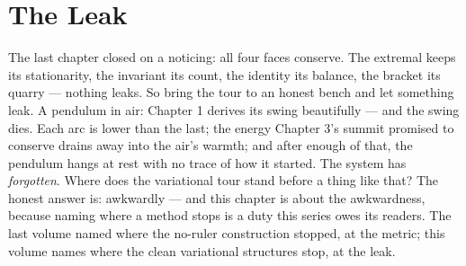 \chapter{The Leak}

The last chapter closed on a noticing: all four faces conserve. The
extremal keeps its stationarity, the invariant its count, the identity
its balance, the bracket its quarry --- nothing leaks. So bring the tour
to an honest bench and let something leak. A pendulum in air: Chapter 1
derives its swing beautifully --- and the swing dies. Each arc is lower
than the last; the energy Chapter 3's summit promised to conserve drains
away into the air's warmth; and after enough of that, the pendulum hangs
at rest with no trace of how it started. The system has \emph{forgotten}.
Where does the variational tour stand before a thing like that? The
honest answer is: awkwardly --- and this chapter is about the
awkwardness, because naming where a method stops is a duty this series
owes its readers. The last volume named where the no-ruler construction
stopped, at the metric; this volume names where the clean variational
structures stop, at the leak.

